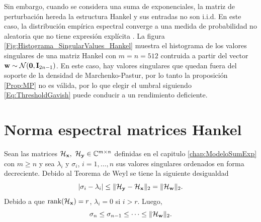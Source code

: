 	Sin embargo, cuando se considera una suma de exponenciales, la matriz de perturbación hereda la estructura Hankel y sus entradas no son i.i.d. En este caso, la distribución empírica espectral converge a una medida de probabilidad no aleatoria que no tiene expresión explícita \cite{Bryc2006}. La figura \ref{Fig:Histograma_SingularValues_Hankel} muestra el histograma de los valores singulares de una matriz Hankel con $m=n=512$ contruida a partir del vector $\mathbf{w}\sim\mathcal{N}(\mathbf{0},\mathbf{I}_{2n-1})$. En este caso, hay valores singulares que quedan fuera del soporte de la densidad de Marchenko-Pastur, por lo tanto la proposición \eqref{Prop:MP} no es válida, por lo que elegir el umbral siguiendo \eqref{Eq:ThresholdGavish} puede conducir a un rendimiento deficiente. 
		
	 
	\section{Norma espectral matrices  Hankel}\label{sec:SpectNorm}
	
		Sean las matrices $\Hank_{\x},\ \Hank_{\y}\in\C^{m\times n}$ definidas en el capitulo \eqref{chap:ModeloSumExp} con $m\ge n$ y sea  $\lambda_i$ y $\sigma_i$, $i = 1,\ldots,n$ sus valores singulares ordenados en forma decreciente. Debido al Teorema de Weyl se tiene la siguiente desigualdad
		\begin{equation}
			|\sigma_i-\lambda_i|\le \|\mathcal{H}_{\mathbf{y}} - \mathcal{H}_{\mathbf{x}}\|_2 = \|\mathcal{H}_{\mathbf{w}}\|_2.
			\label{Eq:WeylInequality}
		\end{equation}
		Debido a que $\mathrm{rank}(\mathcal{H}_{\mathbf{x}})=r$, $\lambda_i=0$ si $i>r$. Luego,
		\begin{equation}
			\sigma_n\le\sigma_{n-1}\le \cdots \le \|\mathcal{H}_{\mathbf{w}}\|_2.
			\label{Eq:WeylInequality2}
		\end{equation}
		
